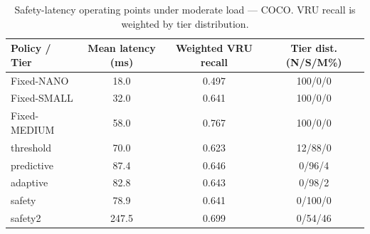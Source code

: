 \begin{table}[t]
\centering
\caption{Safety-latency operating points under moderate load — COCO. VRU recall is weighted by tier distribution.}
\label{tab:pareto_coco}
\begin{tabular}{lccc}
\toprule
Policy / Tier & Mean latency (ms) & Weighted VRU recall & Tier dist. (N/S/M\%) \\
\midrule
Fixed-NANO & 18.0 & 0.497 & 100/0/0 \\
Fixed-SMALL & 32.0 & 0.641 & 100/0/0 \\
Fixed-MEDIUM & 58.0 & 0.767 & 100/0/0 \\
\midrule
threshold & 70.0 & 0.623 & 12/88/0 \\
predictive & 87.4 & 0.646 & 0/96/4 \\
adaptive & 82.8 & 0.643 & 0/98/2 \\
safety & 78.9 & 0.641 & 0/100/0 \\
safety2 & 247.5 & 0.699 & 0/54/46 \\
\bottomrule
\end{tabular}
\end{table}